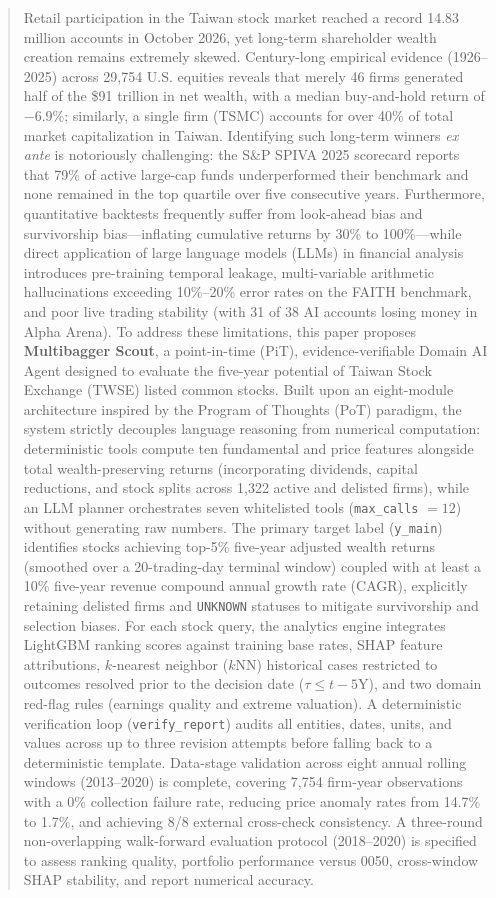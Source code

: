 \documentclass[conference]{IEEEtran}
\begin{document}
\begin{abstract}
Retail participation in the Taiwan stock market reached a record 14.83 million accounts in October 2026, yet long-term shareholder wealth creation remains extremely skewed. Century-long empirical evidence (1926--2025) across 29,754 U.S. equities reveals that merely 46 firms generated half of the \$91 trillion in net wealth, with a median buy-and-hold return of $-$6.9\%; similarly, a single firm (TSMC) accounts for over 40\% of total market capitalization in Taiwan. Identifying such long-term winners \emph{ex ante} is notoriously challenging: the S\&P SPIVA 2025 scorecard reports that 79\% of active large-cap funds underperformed their benchmark and none remained in the top quartile over five consecutive years. Furthermore, quantitative backtests frequently suffer from look-ahead bias and survivorship bias---inflating cumulative returns by 30\% to 100\%---while direct application of large language models (LLMs) in financial analysis introduces pre-training temporal leakage, multi-variable arithmetic hallucinations exceeding 10\%--20\% error rates on the FAITH benchmark, and poor live trading stability (with 31 of 38 AI accounts losing money in Alpha Arena). To address these limitations, this paper proposes \textbf{Multibagger Scout}, a point-in-time (PiT), evidence-verifiable Domain AI Agent designed to evaluate the five-year potential of Taiwan Stock Exchange (TWSE) listed common stocks. Built upon an eight-module architecture inspired by the Program of Thoughts (PoT) paradigm, the system strictly decouples language reasoning from numerical computation: deterministic tools compute ten fundamental and price features alongside total wealth-preserving returns (incorporating dividends, capital reductions, and stock splits across 1,322 active and delisted firms), while an LLM planner orchestrates seven whitelisted tools (\texttt{max\_calls} $= 12$) without generating raw numbers. The primary target label (\texttt{y\_main}) identifies stocks achieving top-5\% five-year adjusted wealth returns (smoothed over a 20-trading-day terminal window) coupled with at least a 10\% five-year revenue compound annual growth rate (CAGR), explicitly retaining delisted firms and \texttt{UNKNOWN} statuses to mitigate survivorship and selection biases. For each stock query, the analytics engine integrates LightGBM ranking scores against training base rates, SHAP feature attributions, $k$-nearest neighbor ($k$NN) historical cases restricted to outcomes resolved prior to the decision date ($\tau \le t - 5\text{Y}$), and two domain red-flag rules (earnings quality and extreme valuation). A deterministic verification loop (\texttt{verify\_report}) audits all entities, dates, units, and values across up to three revision attempts before falling back to a deterministic template. Data-stage validation across eight annual rolling windows (2013--2020) is complete, covering 7,754 firm-year observations with a 0\% collection failure rate, reducing price anomaly rates from 14.7\% to 1.7\%, and achieving 8/8 external cross-check consistency. A three-round non-overlapping walk-forward evaluation protocol (2018--2020) is specified to assess ranking quality, portfolio performance versus 0050, cross-window SHAP stability, and report numerical accuracy.

\end{abstract}
\end{document}
